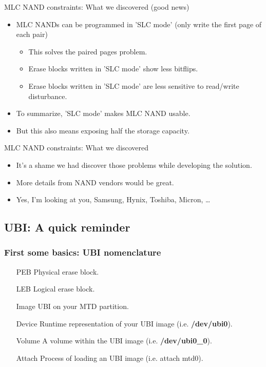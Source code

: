 \documentclass[aspectratio=169,obeyspaces,spaces,hyphens,dvipsnames]{beamer}
\begin{document}
\begin{frame}{MLC NAND constraints: What we discovered (good news)}
  \begin{itemize}
  \item MLC NANDs can be programmed in 'SLC mode' (only write the first
	page of each pair)
    \begin{itemize}
    \item This solves the paired pages problem.
    \item Erase blocks written in 'SLC mode' show less bitflips.
    \item Erase blocks written in 'SLC mode' are less sensitive to
	  read/write disturbance.
    \end{itemize}
  \item To summarize, 'SLC mode' makes MLC NAND usable.
  \item But this also means exposing half the storage capacity.
  \end{itemize}
\end{frame}

\begin{frame}{MLC NAND constraints: What we discovered}
  \begin{itemize}
  \item It's a shame we had discover those problems while developing the
	solution.
  \item More details from NAND vendors would be great.
  \item Yes, I'm looking at you, Samsung, Hynix, Toshiba, Micron, \ldots
  \end{itemize}
\end{frame}

\subsection{UBI: A quick reminder}

\begin{frame}[fragile]
\frametitle{First some basics: UBI nomenclature}
  \begin{itemize}
  \item[PEB] Physical erase block.
  \item[LEB] Logical erase block.
  \item[Image] UBI on your MTD partition.
  \item[Device] Runtime representation of your UBI image (i.e. \textbf{/dev/ubi0}).
  \item[Volume] A volume within the UBI image (i.e. \textbf{/dev/ubi0\_0}).
  \item[Attach] Process of loading an UBI image (i.e. attach mtd0).
  \end{itemize}
\end{frame}
\end{document}
